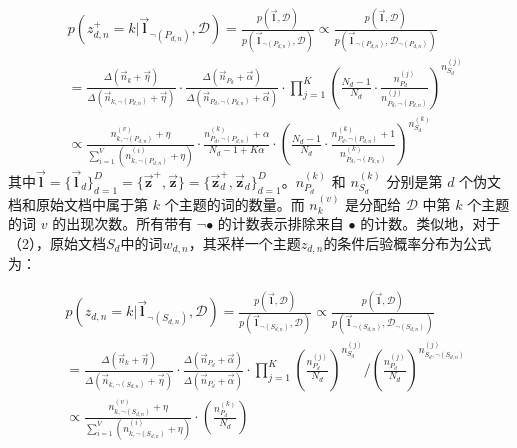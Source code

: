 \begin{equation}
\begin{aligned}
    &p(z_{d,n}^+=k|\boldsymbol{\vec l}_{\neg(P_{d,n})},\mathcal{D})=\frac{p(\boldsymbol{\vec l},\mathcal{D})}{p(\boldsymbol{\vec l}_{\neg(P_{d,n})},\mathcal{D})}\propto\frac{p(\boldsymbol{\vec l},\mathcal{D})}{p(\boldsymbol{\vec l}_{\neg(P_{d,n})},\mathcal{D}_{\neg(P_{d,n})})}\\
    &=\frac{\Delta(\vec n_k+\vec\eta)}{\Delta(\vec n_{k,\neg(P_{d,n})} + \vec\eta)}\cdot\frac{\Delta(\vec n_{P_d}+\vec\alpha)}{\Delta(\vec n_{P_d,\neg(P_{d,n})}+\vec\alpha)}\cdot\prod_{j=1}^K\left(\frac{N_d-1}{N_d}\cdot\frac{n_{P_d}^{(j)}}{n_{P_d,\neg(P_{d,n})}^{(j)}}\right)^{n_{S_d}^{(j)}}\\
    &\propto\frac{n_{k,\neg(P_{d,n})}^{(v)}+\eta}{\sum_{i=1}^V(n_{k,\neg(P_{d,n})}^{(i)}+\eta)}
    \cdot\frac{n_{P_d,\neg(P_{d,n})}^{(k)}+\alpha}{N_d-1+K\alpha}\cdot\left(\frac{N_d-1}{N_d}\cdot\frac{n_{P_d,\neg(P_{d,n})}^{(k)}+1}{n_{P_d,\neg(P_{d,n})}^{(k)}}\right)^{n_{S_d}^{(k)}}
    \end{aligned}
\end{equation}
其中$\boldsymbol{\vec l}=\{\boldsymbol{\vec l}_d\}_{d=1}^D=\{\boldsymbol{\vec z}^+, \boldsymbol{\vec z}\}=\{\boldsymbol{\vec z}_d^+,\boldsymbol{\vec z}_d\}_{d=1}^D$。$n_{P_d}^{(k)}$ 和 $n_{S_d}^{(k)}$ 分别是第 $d$ 个伪文档和原始文档中属于第 $k$ 个主题的词的数量。而 $n_k^{(v)}$ 是分配给 $\mathcal{D}$ 中第 $k$ 个主题的词 $v$ 的出现次数。所有带有 $\neg\bullet$ 的计数表示排除来自 $\bullet$ 的计数。类似地，对于（2），原始文档$S_d$中的词$w_{d,n}$，其采样一个主题$z_{d,n}$的条件后验概率分布为公式为：

\begin{equation}
\begin{aligned}
&p(z_{d,n}=k|\boldsymbol{\vec l}_{\neg(S_{d,n})},\mathcal{D})=\frac{p(\boldsymbol{\vec l},\mathcal{D})}{p(\boldsymbol{\vec l}_{\neg(S_{d,n})},\mathcal{D})}\propto\frac{p(\boldsymbol{\vec l},\mathcal{D})}{p(\boldsymbol{\vec l}_{\neg(S_{d,n})},\mathcal{D}_{\neg(S_{d,n})})}\\
&=\frac{\Delta(\vec n_k+\vec\eta)}{\Delta(\vec n_{k,\neg(S_{d,n})} + \vec\eta)}\cdot\frac{\Delta(\vec n_{P_d}+\vec\alpha)}{\Delta(\vec n_{P_d}+\vec\alpha)}\cdot\prod_{j=1}^K\left(\frac{n_{P_d}^{(j)}}{N_d}\right)^{n_{S_d}^{(j)}}/\left(\frac{n_{P_d}^{(j)}}{N_d}\right)^{n_{S_d,\neg(S_{d,n})}^{(j)}}\\
&\propto\frac{n_{k,\neg(S_{d,n})}^{(v)}+\eta}{\sum_{i=1}^V(n_{k,\neg(S_{d,n})}^{(i)}+\eta)}\cdot\left(\frac{n_{P_d}^{(k)}}{N_d}\right)
\end{aligned}
\end{equation}